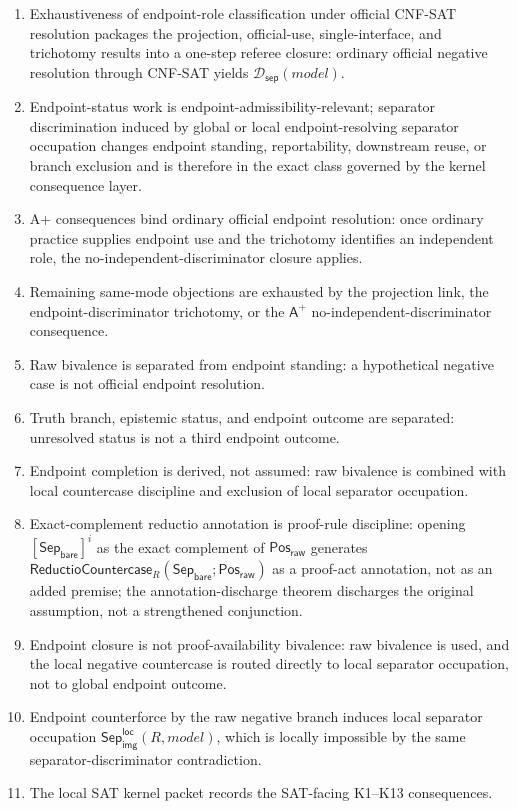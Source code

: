 \documentclass[11pt]{article}
\theoremstyle{definition}
\theoremstyle{remark}
\newcommand{\PosRaw}{\mathsf{Pos}_{\mathsf{raw}}}
\newcommand{\SepBare}{\mathsf{Sep}_{\mathsf{bare}}}
\newcommand{\LocalSepImgOcc}{\mathsf{Sep}_{\mathsf{img}}^{\mathsf{loc}}}
\newcommand{\Aplus}{\mathsf{A}^{+}}
\newcommand{\SepDisc}{\mathcal{D}_{\mathsf{sep}}}
\newcommand{\ReductioCountercase}{\mathsf{ReductioCountercase}}
\begin{document}
\begin{enumerate}
\item Exhaustiveness of endpoint-role classification under official CNF-SAT resolution packages the projection, official-use, single-interface, and trichotomy results into a one-step referee closure: ordinary official negative resolution through CNF-SAT yields \(\SepDisc(model)\).
\item Endpoint-status work is endpoint-admissibility-relevant; separator discrimination induced by global or local endpoint-resolving separator occupation changes endpoint standing, reportability, downstream reuse, or branch exclusion and is therefore in the exact class governed by the kernel consequence layer.
\item A+ consequences bind ordinary official endpoint resolution: once ordinary practice supplies endpoint use and the trichotomy identifies an independent role, the no-independent-discriminator closure applies.
\item Remaining same-mode objections are exhausted by the projection link, the endpoint-discriminator trichotomy, or the \(\Aplus\) no-independent-discriminator consequence.
\item Raw bivalence is separated from endpoint standing: a hypothetical negative case is not official endpoint resolution.
\item Truth branch, epistemic status, and endpoint outcome are separated: unresolved status is not a third endpoint outcome.
\item Endpoint completion is derived, not assumed: raw bivalence is combined with local countercase discipline and exclusion of local separator occupation.
\item Exact-complement reductio annotation is proof-rule discipline: opening \([\SepBare]^i\) as the exact complement of \(\PosRaw\) generates \(\ReductioCountercase_R(\SepBare;\PosRaw)\) as a proof-act annotation, not as an added premise; the annotation-discharge theorem discharges the original assumption, not a strengthened conjunction.
\item Endpoint closure is not proof-availability bivalence: raw bivalence is used, and the local negative countercase is routed directly to local separator occupation, not to global endpoint outcome.
\item Endpoint counterforce by the raw negative branch induces local separator occupation \(\LocalSepImgOcc(R,model)\), which is locally impossible by the same separator-discriminator contradiction.
\item The local SAT kernel packet records the SAT-facing K1--K13 consequences.

\end{enumerate}
\end{document}
